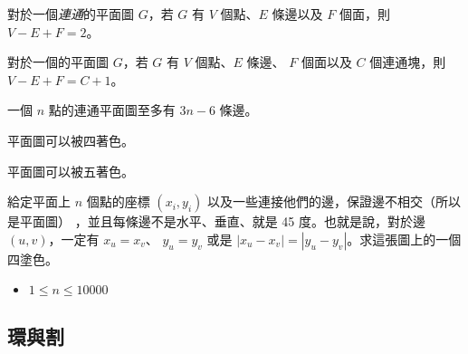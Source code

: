 \documentclass[standalone]{beamer}
\begin{document}
\begin{frame}{}
   {
    \begin{theorem}[尤拉公式]
      對於一個\emph{連通}的平面圖 $G$，若 $G$ 有 $V$ 個點、$E$ 條邊以及 $F$ 個面，則 $V - E + F = 2$。
    \end{theorem}
  }
   {
    \begin{theorem}[尤拉公式]
      對於一個的平面圖 $G$，若 $G$ 有 $V$ 個點、$E$ 條邊、 $F$ 個面以及 $C$ 個連通塊，則 $V - E + F = C + 1$。
    \end{theorem}
  }
   {
    \begin{corollary}
      一個 $n$ 點的連通平面圖至多有 $3n - 6$ 條邊。
    \end{corollary}
  }
\end{frame}

\begin{frame}{}
   {
    \begin{theorem}[四色定理]
      平面圖可以被四著色。
    \end{theorem}
  }
   {
    \begin{theorem}[五色定理]
      平面圖可以被五著色。
    \end{theorem}
  }
   {
    \begin{problem}
      給定平面上 $n$ 個點的座標 $(x_i, y_i)$ 以及一些連接他們的邊，保證邊不相交（所以是平面圖）
      ，並且每條邊不是水平、垂直、就是 45 度。也就是說，對於邊 $(u, v)$，一定有 $x_u = x_v$、
      $y_u = y_v$ 或是 $|x_u - x_v| = |y_u - y_v|$。求這張圖上的一個四塗色。

      \begin{itemize}
        \item $1 \leq n \leq 10000$
      \end{itemize}
    \end{problem}
  }
\end{frame}

\subsection{環與割}
\end{document}
